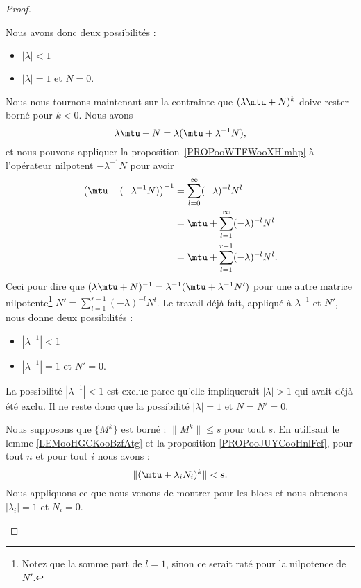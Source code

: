 \begin{proof}
\begin{subproof}
		Nous avons donc deux possibilités :
		\begin{itemize}
			\item \( | \lambda |<1\)
			\item \( | \lambda |=1\) et \( N=0\).
		\end{itemize}

		Nous nous tournons maintenant sur la contrainte que \( (\lambda\mtu+N)^k\) doive rester borné pour \( k<0\). Nous avons
		\begin{equation}
			\lambda\mtu+N=\lambda(\mtu+\lambda^{-1}N),
		\end{equation}
		et nous pouvons appliquer la proposition~\ref{PROPooWTFWooXHlmhp} à l'opérateur nilpotent \( -\lambda^{-1} N\) pour avoir
		\begin{subequations}
			\begin{align}
				\big( \mtu-(-\lambda^{-1}N) \big)^{-1} & =\sum_{l=0}^{\infty}(-\lambda)^{-l}N^l      \\
				                                       & =\mtu+\sum_{l=1}^{\infty}(-\lambda)^{-l}N^l \\
				                                       & =\mtu+\sum_{l=1}^{r-1}(-\lambda)^{-l}N^l.
			\end{align}
		\end{subequations}
		Ceci pour dire que \( (\lambda\mtu+N)^{-1}=\lambda^{-1}(\mtu+\lambda^{-1}N')\) pour une autre matrice nilpotente\footnote{Notez que la somme part de \( l=1\), sinon ce serait raté pour la nilpotence de \( N'\).} \( N'=\sum_{l=1}^{r-1}(-\lambda)^{-l}N^l\). Le travail déjà fait, appliqué à \( \lambda^{-1}\) et \( N'\), nous donne deux possibilités :
		\begin{itemize}
			\item \( | \lambda^{-1} |<1\)
			\item \( | \lambda^{-1} |=1\) et \( N'=0\).
		\end{itemize}
		La possibilité \( | \lambda^{-1} |<1\) est exclue parce qu'elle impliquerait \( | \lambda |>1\) qui avait déjà été exclu. Il ne reste donc que la possibilité \( | \lambda |=1\) et \( N=N'=0\).

		Nous supposons que \( \{ M^k \}\) est borné : \( \| M^k \|\leq s\) pour tout \( s\). En utilisant le lemme \ref{LEMooHGCKooBzfAtg} et la proposition \ref{PROPooJUYCooHnlFef}, pour tout \( n\) et pour tout \( i\) nous avons :
		\begin{equation}
			\| (\mtu+\lambda_iN_i)^k \|<s.
		\end{equation}
		Nous appliquons ce que nous venons de montrer pour les blocs et nous obtenons \( | \lambda_i |=1\) et \( N_i=0\).


\end{subproof}
\end{proof}
